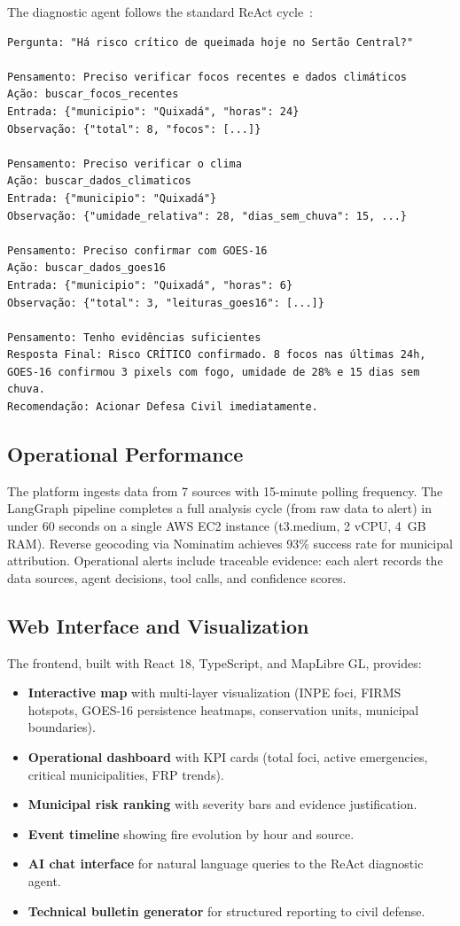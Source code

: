 \documentclass[11pt,twocolumn,a4paper]{article}
\newcommand{\abbrev}[1]{{\small\textsc{#1}}}
\begin{document}
The diagnostic agent follows the standard ReAct cycle~\cite{langchain2025}:

\begin{verbatim}
Pergunta: "Há risco crítico de queimada hoje no Sertão Central?"

Pensamento: Preciso verificar focos recentes e dados climáticos
Ação: buscar_focos_recentes
Entrada: {"municipio": "Quixadá", "horas": 24}
Observação: {"total": 8, "focos": [...]}

Pensamento: Preciso verificar o clima
Ação: buscar_dados_climaticos
Entrada: {"municipio": "Quixadá"}
Observação: {"umidade_relativa": 28, "dias_sem_chuva": 15, ...}

Pensamento: Preciso confirmar com GOES-16
Ação: buscar_dados_goes16
Entrada: {"municipio": "Quixadá", "horas": 6}
Observação: {"total": 3, "leituras_goes16": [...]}

Pensamento: Tenho evidências suficientes
Resposta Final: Risco CRÍTICO confirmado. 8 focos nas últimas 24h,
GOES-16 confirmou 3 pixels com fogo, umidade de 28% e 15 dias sem chuva.
Recomendação: Acionar Defesa Civil imediatamente.
\end{verbatim}

\subsection{Operational Performance}

The platform ingests data from 7 sources with 15-minute polling frequency. The LangGraph pipeline completes a full analysis cycle (from raw data to alert) in under 60 seconds on a single AWS EC2 instance (t3.medium, 2 vCPU, 4~GB RAM). Reverse geocoding via Nominatim achieves 93\% success rate for municipal attribution. Operational alerts include traceable evidence: each alert records the data sources, agent decisions, tool calls, and confidence scores.

\subsection{Web Interface and Visualization}

The frontend, built with React 18, TypeScript, and MapLibre GL, provides:
\begin{itemize}
  \item \textbf{Interactive map} with multi-layer visualization (\abbrev{INPE} foci, \abbrev{FIRMS} hotspots, \abbrev{GOES-16} persistence heatmaps, conservation units, municipal boundaries).
  \item \textbf{Operational dashboard} with \abbrev{KPI} cards (total foci, active emergencies, critical municipalities, \abbrev{FRP} trends).
  \item \textbf{Municipal risk ranking} with severity bars and evidence justification.
  \item \textbf{Event timeline} showing fire evolution by hour and source.
  \item \textbf{AI chat interface} for natural language queries to the ReAct diagnostic agent.
  \item \textbf{Technical bulletin generator} for structured reporting to civil defense.
\end{itemize}
\end{document}
